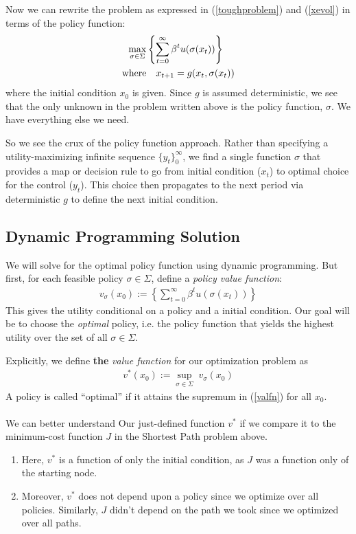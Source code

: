 \documentclass[a4paper,12pt]{scrartcl}
\begin{document}
Now we can rewrite the problem as expressed in
(\ref{toughproblem}) and (\ref{xevol}) in terms of the policy
function:
\begin{align}
  \label{policyapproach}
  \max_{\sigma \in \Sigma} 
  &\left\{ \sum^\infty_{t=0} \beta^t u(\sigma(x_t)) \right\}\\
  \text{where} &\quad
  x_{t+1} = g(x_t, \sigma(x_t)) \notag
\end{align}
where the initial condition $x_0$ is given. Since $g$ is
assumed deterministic, we see that the only unknown in the
problem written above is the policy function, $\sigma$. We have
everything else we need.

So we see the crux of the policy function approach. Rather than
specifying a utility-maximizing infinite sequence
$\{y_t\}^\infty_0$, we find a single function $\sigma$ that
provides a map or decision rule to go from initial condition ($x_t$) to optimal choice for the control ($y_t$).
This choice then propagates to the next period via deterministic
$g$ to define the next initial condition.

\subsection{Dynamic Programming Solution}

We will solve for the optimal policy function using dynamic
programming. But first, for each feasible policy $\sigma\in
\Sigma$, define a \emph{policy value
function}:
\begin{align*}
  v_\sigma(x_0) :=
  \left\{ \sum^\infty_{t=0} \beta^t u(\sigma(x_t)) \right\}
\end{align*}
This gives the utility conditional on a policy and a initial
condition.  Our goal will be to choose the \emph{optimal}
policy, i.e. the policy function that yields the highest utility
over the set of all $\sigma \in \Sigma$.

Explicitly, we define \textbf{the} \emph{value function} for
our optimization problem as 
\begin{align}
  \label{valfn}
  v^*(x_0) := \sup_{\sigma\in\Sigma} \; v_\sigma(x_0)
\end{align}
A policy is called ``optimal'' if it attains the supremum in
(\ref{valfn}) for all $x_0$. 
\\
\\
We can better understand Our just-defined function $v^*$ if we
compare it to the minimum-cost function $J$ in the Shortest Path
problem above.
\begin{enumerate}
  \item Here, $v^*$ is a function of only the initial condition,
    as $J$ was a function only of the starting node.
  \item Moreover, $v^*$ does not depend upon a policy since we
    optimize over all policies. Similarly, $J$ didn't depend on
    the path we took since we optimized over all paths.
\end{enumerate}
\end{document}
